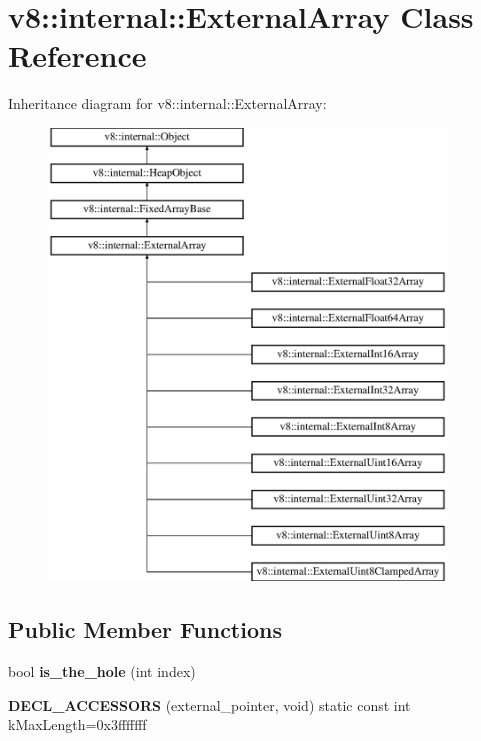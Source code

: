 \hypertarget{classv8_1_1internal_1_1_external_array}{}\section{v8\+:\+:internal\+:\+:External\+Array Class Reference}
\label{classv8_1_1internal_1_1_external_array}
Inheritance diagram for v8\+:\+:internal\+:\+:External\+Array\+:\begin{figure}[H]
\begin{center}
\leavevmode
\includegraphics[height=12.000000cm]{classv8_1_1internal_1_1_external_array}
\end{center}
\end{figure}
\subsection*{Public Member Functions}
\begin{DoxyCompactItemize}
\item 
\hypertarget{classv8_1_1internal_1_1_external_array_a8a60cc282409b779e747dbcfe3d23015}{}bool {\bfseries is\+\_\+the\+\_\+hole} (int index)\label{classv8_1_1internal_1_1_external_array_a8a60cc282409b779e747dbcfe3d23015}

\item 
\hypertarget{classv8_1_1internal_1_1_external_array_ae885012924ed465ccb24879998807bbe}{}{\bfseries D\+E\+C\+L\+\_\+\+A\+C\+C\+E\+S\+S\+O\+R\+S} (external\+\_\+pointer, void) static const int k\+Max\+Length=0x3fffffff\label{classv8_1_1internal_1_1_external_array_ae885012924ed465ccb24879998807bbe}

\end{DoxyCompactItemize}
